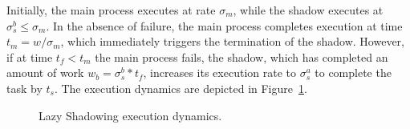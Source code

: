 Initially, the main process executes at rate $\sigma_m$, while the shadow executes at $\sigma_s^b \le \sigma_m$. %
In the absence of failure, the main process completes execution at time 
$t_m = w/\sigma_m$, which immediately triggers the termination of the
shadow. However, if at time $t_f < t_m$ the main process fails, the shadow, which has completed an amount of work $w_b=\sigma_s^b * t_f$, increases its execution rate to $\sigma_s^a$ to complete the task by $t_s$. %
The execution dynamics are depicted in Figure~\ref{fig:sync}.

\begin{figure}[!t]
	\begin{center}
	\end{center}
	\caption{Lazy Shadowing execution dynamics.}
	\label{fig:sync}
\end{figure}

